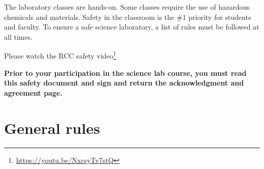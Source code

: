 \documentclass[]{book}
\let\rmarkdownfootnote\footnote%
\def\footnote{\protect\rmarkdownfootnote}
\renewcommand{\href}[2]{#2\footnote{\url{#1}}}
\let\BeginKnitrBlock\begin \let\EndKnitrBlock\end
\begin{document}
The laboratory classes are hands-on. Some classes require the use of hazardous chemicals and materials. Safety in the classroom is the \#1 priority for students and faculty. To ensure a safe science laboratory, a list of rules must be followed at all times.

Please watch the \href{https://youtu.be/NxcsyTv7stQ}{RCC safety video}

\BeginKnitrBlock{rmdimportant}
\textbf{Prior to your participation in the science lab course, you must read this safety document and sign and return the acknowledgment and agreement page.}
\EndKnitrBlock{rmdimportant}

\hypertarget{general-rules}{%
\section{General rules}\label{general-rules}}
\end{document}
